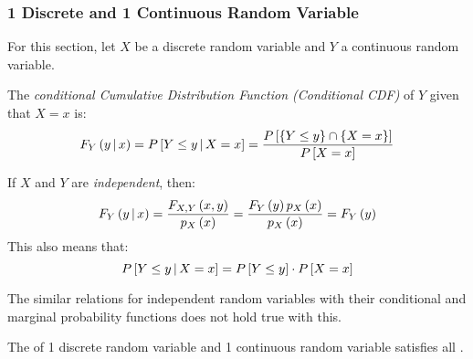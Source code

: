\subsubsection{1 Discrete and 1 Continuous Random Variable}\label{subsubsec:1 Discrete 1 Continuous Random Variables}
For this section, let $X$ be a discrete random variable and $Y$ a continuous random variable.
\begin{definition}\label{def:1 Discrete 1 Continuous-Conditional CDF}
  The \emph{conditional Cumulative Distribution Function (Conditional CDF)} of $Y$ given that $X=x$ is:
  \begin{equation}\label{eq:1 Discrete 1 Continuous-Conditional CDF}
    F_{Y} \left( y \operatorname{\vert} x \right) = P \left[ Y \leq y \operatorname{\vert} X=x \right]
    = \frac{P \left[ \lbrace Y \leq y \rbrace \cap \lbrace X=x \rbrace \right]}{P \left[ X=x \right]}
  \end{equation}
  \begin{remark}
    If $X$ and $Y$ are \emph{independent}, then:
    \begin{equation}\label{eq:1 Discrete 1 Continuous-Independent Conditional CDF}
      F_{Y} \left( y \operatorname{\vert} x \right)
      = \frac{F_{X,Y} \left( x,y \right)}{p_{X} \left( x \right)}
      = \frac{F_{Y} \left( y \right) p_{X} \left( x \right)}{p_{X} \left( x \right)}
      = F_{Y} \left( y \right)
    \end{equation}
    This also means that:
    \begin{equation*}
      P \left[ Y \leq y \operatorname{\vert} X=x \right]
      = P \left[ Y \leq y \right] \cdot P \left[ X=x \right]
    \end{equation*}
  \end{remark}
  \begin{remark}
    The similar relations for independent random variables with their conditional and marginal probability functions does not hold true with this.
  \end{remark}
  \begin{remark}
    The  of 1 discrete random variable and 1 continuous random variable satisfies all .
  \end{remark}
\end{definition}
